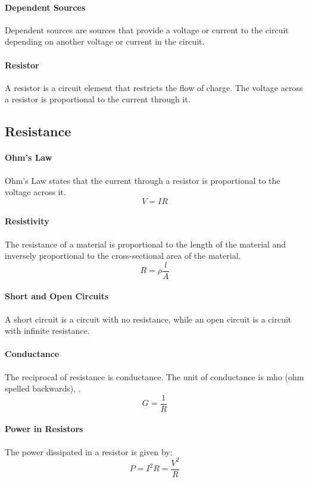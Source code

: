 \documentclass[11pt]{article}
\begin{document}
\paragraph{Dependent Sources} Dependent sources are sources that provide a voltage or current to the circuit depending on another voltage or current in the circuit.
\paragraph{Resistor} A resistor is a circuit element that restricts the flow of charge. The voltage across a resistor is proportional to the current through it.

\subsection{Resistance}
\paragraph{Ohm's Law} Ohm's Law states that the current through a resistor is proportional to the voltage across it.
\begin{equation}
    V = IR
\end{equation}
\paragraph{Resistivity} The resistance of a material is proportional to the length of the material and inversely proportional to the cross-sectional area of the material.
\begin{equation}
    R = \rho \frac{l}{A}
\end{equation}
\paragraph{Short and Open Circuits} A short circuit is a circuit with no resistance, while an open circuit is a circuit with infinite resistance.
\paragraph{Conductance} The reciprocal of resistance is conductance. The unit of conductance is mho (ohm spelled backwards), .
\begin{equation}
    G = \frac{1}{R}
\end{equation}
\paragraph{Power in Resistors} The power dissipated in a resistor is given by:
\begin{equation}
    P = I^2R = \frac{V^2}{R}
\end{equation}
\end{document}
